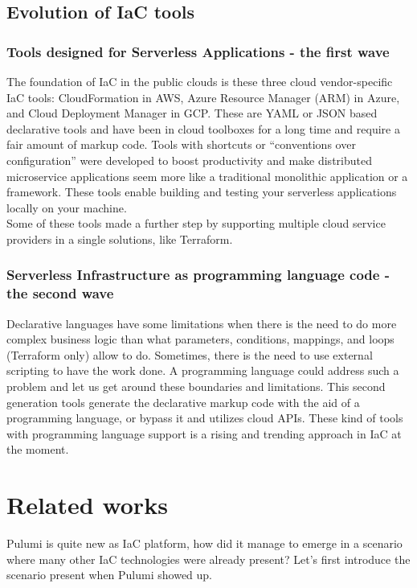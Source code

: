 \subsection{Evolution of IaC tools}

\subsubsection{Tools designed for Serverless Applications - the first wave}
The foundation of IaC in the public clouds is these three cloud vendor-specific IaC tools: \gls{CloudFormation} in \gls{AWS}, \gls{Azure Resource Manager} (ARM) in \gls{Azure}, and \gls{Cloud Deployment Manager} in \gls{GCP}.
These are YAML or JSON based declarative tools and have been in cloud toolboxes for a long time and require a fair amount of markup code.
Tools with shortcuts or “conventions over configuration” were developed to boost productivity and make distributed microservice applications seem more like a traditional monolithic application or a framework.
These tools enable building and testing your serverless applications locally on your machine.\\
Some of these tools made a further step by supporting multiple cloud service providers in a single solutions, like Terraform.
\subsubsection{Serverless Infrastructure as programming language code - the second wave}
\label{sssec:second-wave}
Declarative languages have some limitations when there is the need to do more complex business logic than what parameters, conditions, mappings, and loops (Terraform only) allow to do.
Sometimes, there is the need to use external scripting to have the work done.
A programming language could address such a problem and let us get around these boundaries and limitations.
This second generation tools generate the declarative markup code with the aid of a programming language, or bypass it and utilizes cloud APIs.
These kind of tools with programming language support is a rising and trending approach in IaC at the moment.

\section{Related works}
Pulumi is quite new as IaC platform, how did it manage to emerge in a scenario where many other IaC technologies were already present?
Let's first introduce the scenario present when Pulumi showed up.

